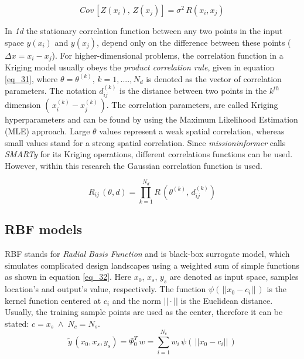 \begin{equation}
    \label{eq_30}
    Cov\, [Z(x_i), \,Z(x_j)] = \sigma^2\, R(x_i, x_j)
\end{equation}

In \emph{1d} the stationary correlation function 
between 
any two points in the input space $y(x_i)$
and $y(x_j)$, depend only on the difference 
between these points ($\Delta x = x_i - x_j$).
For higher-dimensional problems, the correlation function 
in a Kriging model usually 
obeys the \emph{product correlation rule}, given in
equation \eqref{eq_31}, 
where $\theta = \theta^{(k)}, \, k= 1,...., N_d$ is denoted as the 
vector of correlation parameters. The notation $d_{ij}^{(k)}$ is the distance 
between two points in the $k^{th}$ dimension $(\, x_i^{(k)} 
- x_j ^{(k)\,})$. The correlation parameters, are called Kriging 
hyperparameters and can be found by using the 
Maximum Likelihood Estimation (MLE) approach. Large 
$\theta$ values represent a weak spatial correlation, whereas 
small values stand for a strong spatial correlation.
Since \emph{missioninformer} calls \emph{SMARTy} for its 
Kriging operations, different correlations 
functions can be used. However, within this research 
the Gaussian correlation function
is used.


\begin{equation}
    \label{eq_31}
    R_{ij}\,(\theta, d) = \prod_{k = 1}^{N_d} R\,(\theta ^{(k)}, \, 
    d_{ij}^{(k)})
\end{equation}


\subsection{RBF models}
\label{subsec_RBF_Surrogate}
RBF stands for \emph{Radial Basis Function} and is 
black-box surrogate model, which simulates complicated 
design landscapes using a weighted sum of 
simple functions as shown in equation \eqref{eq_32}.
Here $x_0,\, x_s,\, y_s$ are denoted as 
input space, samples location's and output's value, respectively.
The function $\psi (\,||x_0 -c_i||\,)$ is the kernel
function centered at $c_i$ and the norm $||\cdot||$ is 
the Euclidean distance. Usually, the training sample points are used as 
the center, therefore it can be stated: $c = x_s \;\wedge \; N_c = N_s$.
\begin{equation}
    \label{eq_32}
    \tilde{y}\,(x_0, x_s, y_s) = \Psi_{0}^{T} \, w =
    \sum_{i = 1}^{N_c} w_i \, \psi (\,||x_0 -c_i||\,)
\end{equation}

